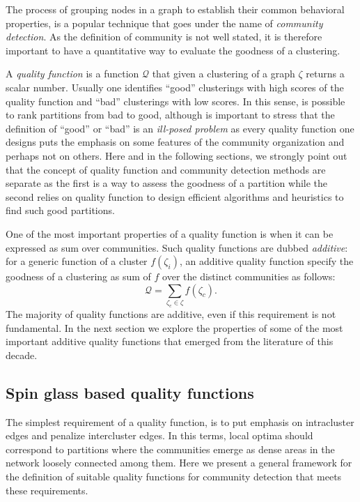 The process of grouping nodes in a graph to establish their common behavioral properties, is a popular technique that goes under the name of \emph{community detection}. As the definition of community is not well stated, it is therefore important to have a quantitative way to evaluate the goodness of a clustering.

A \emph{quality function} is a function $\mathcal{Q}$ that given a clustering of a graph $\zeta$ returns a scalar number. Usually one identifies ``good'' clusterings with high scores of the quality function and ``bad'' clusterings with low scores. In this sense, is possible to rank partitions from bad to good, although is important to stress that the definition of ``good'' or ``bad'' is an \emph{ill-posed problem} as every quality function one designs puts the emphasis on some features of the community organization and perhaps not on others.
Here and in the following sections, we strongly point out that the concept of quality function and community detection methods are separate as the first is a way to assess the goodness of a partition while the second relies on quality function to design efficient algorithms and heuristics to find such good partitions.

One of the most important properties of a quality function is when it can be expressed as sum over communities. Such quality functions are dubbed \emph{additive}: for a generic function of a cluster $f(\zeta_i)$, an additive quality function specify the goodness of a clustering as sum of $f$ over the distinct communities as follows:
\begin{equation}\label{eq:additive_quality}
\mathcal{Q} = \sum \limits_{\zeta_c \in \zeta} f(\zeta_c).
\end{equation}
The majority of quality functions are additive, even if this requirement is not fundamental. In the next section we explore the properties of some of the most important additive quality functions that emerged from the literature of this decade.

\subsection{Spin glass based quality functions}
The simplest requirement of a quality function, is to put emphasis on intracluster edges and penalize intercluster edges. In this terms, local optima should correspond to partitions where the communities emerge as dense areas in the network loosely connected among them.
Here we present a general framework for the definition of suitable quality functions for community detection that meets these requirements.

